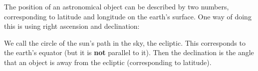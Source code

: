 The position of an astronomical object can be described by two numbers, corresponding
to latitude and longitude on the earth's surface. One way of doing this is using
right ascension and declination:
\par
We call the circle of the sun's path in the sky, the ecliptic. This corresponds to the
earth's equator (but it is \textbf{not} parallel to it). Then the declination is the 
angle that an object is away from the ecliptic (corresponding to latitude).